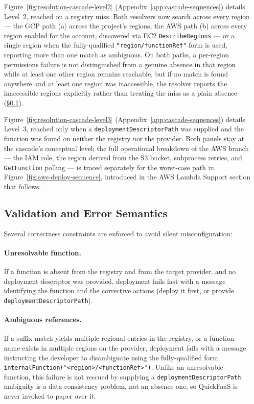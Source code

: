 Figure~\ref{fig:resolution-cascade-level2} (Appendix~\ref{app:cascade-sequences}) details Level~2,
reached on a registry miss. Both resolvers now search across every region --- the GCP path (a)
across the project's regions, the AWS path (b) across every region enabled for the account,
discovered via EC2 \texttt{DescribeRegions} --- or a single region when the fully-qualified
\texttt{"region/functionRef"} form is used, reporting more than one match as ambiguous. On both
paths, a per-region permissions failure is not distinguished from a genuine absence in that region
while at least one other region remains reachable, but if no match is found anywhere and at least
one region was inaccessible, the resolver reports the inaccessible regions explicitly rather than
treating the miss as a plain absence (\S\ref{subsec:validation-error-semantics}).

Figure~\ref{fig:resolution-cascade-level3} (Appendix~\ref{app:cascade-sequences}) details Level~3,
reached only when a \texttt{deploymentDescriptorPath} was supplied and the function was found on
neither the registry nor the provider. Both panels stay at the cascade's conceptual level; the
full operational breakdown of the AWS branch --- the IAM role, the region derived from the S3
bucket, subprocess retries, and \texttt{GetFunction} polling --- is traced separately for the
worst-case path in Figure~\ref{fig:aws-deploy-sequence}, introduced in the AWS Lambda Support
section that follows.

\subsection{Validation and Error Semantics}
\label{subsec:validation-error-semantics}
Several correctness constraints are enforced to avoid silent misconfiguration:

\paragraph{Unresolvable function.}
If a function is absent from the registry and from the target provider, and no deployment
descriptor was provided, deployment fails fast with a message identifying the function and
the corrective actions (deploy it first, or provide \texttt{deploymentDescriptorPath}).

\paragraph{Ambiguous references.}
If a suffix match yields multiple regional entries in the registry, or a function name
exists in multiple regions on the provider, deployment fails with a message instructing the
developer to disambiguate using the fully-qualified form
\texttt{internalFunction("<region>/<functionRef>")}. Unlike an unresolvable function, this
failure is not rescued by supplying a \texttt{deploymentDescriptorPath}: ambiguity is a
data-consistency problem, not an absence one, so QuickFaaS is never invoked to paper over it.

